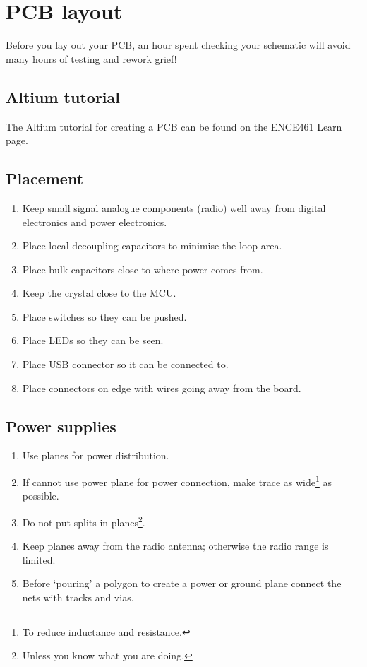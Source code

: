 \chapter{PCB layout}

Before you lay out your PCB, an hour spent checking your schematic
will avoid many hours of testing and rework grief!


\section{Altium tutorial}

The Altium tutorial for creating a PCB can be found on the ENCE461
Learn page.


\label{pcb-recommendations}

\section{Placement}
\label{placement}

\begin{enumerate}
\item
  Keep small signal analogue components (radio) well away from digital
  electronics and power electronics.
\item
  Place local decoupling capacitors to minimise the loop area.
\item
  Place bulk capacitors close to where power comes from.
\item
  Keep the crystal close to the MCU.
\item
  Place switches so they can be pushed.
\item
  Place LEDs so they can be seen.
\item
  Place USB connector so it can be connected to.
\item
  Place connectors on edge with wires going away from the board.
\end{enumerate}


\section{Power supplies}

\begin{enumerate}
  
\item Use planes for power distribution.

\item If cannot use power plane for power connection, make trace as
  wide\footnote{To reduce inductance and resistance.} as possible.

\item Do not put splits in planes\footnote{Unless you know what you
  are doing.}.

\item Keep planes away from the radio antenna; otherwise the radio
  range is limited.

\item Before `pouring' a polygon to create a power or ground plane
  connect the nets with tracks and vias.
\end{enumerate}


